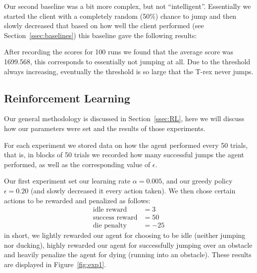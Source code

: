 \documentclass{scrartcl}
\begin{document}
    Our second baseline was a bit more complex, but not ``intelligent''.
    Essentially we started the client with a completely random (50\%) chance to
    jump and then slowly decreased that based on how well the client performed
    (see Section~\ref{ssec:baselines}) this baseline gave the following results:

    After recording the scores for 100 runs we found that the average score was
    1699.568, this corresponds to essentially not jumping at all. Due to the
    threshold always increasing, eventually the threshold is so large that the
    T-rex never jumps.

    \subsection{Reinforcement Learning}
    Our general methodology is discussed in Section~\ref{ssec:RL}, here we will
    discuss how our parameters were set and the results of those experiments.

    For each experiment we stored data on how the agent performed every 50
    trials, that is, in blocks of 50 trials we recorded how many successful
    jumps the agent performed, as well as the corresponding value of
    $\epsilon$.

    Our first experiment set our learning rate $\alpha = 0.005$, and our
    greedy policy $\epsilon = 0.20$ (and slowly decreased it every action
    taken). We then chose certain actions to be rewarded and penalized as
    follows:
    \begin{align*}
        \text{idle reward} &= 3\\
        \text{success reward} &= 50\\
        \text{die penalty} & = -25
    \end{align*}
    in short, we lightly rewarded our agent for choosing to be idle (neither
    jumping nor ducking), highly rewarded our agent for successfully jumping
    over an obstacle and heavily penalize the agent for dying (running into an
    obstacle). These results are displayed in Figure~\ref{fig:exp1}.
\end{document}
